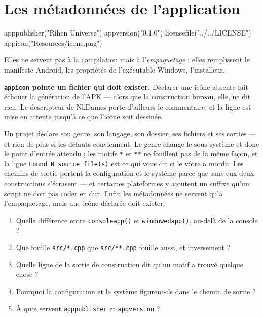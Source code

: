 \section{Les métadonnées de l'application}

\begin{nkcode}{}
apppublisher("Rihen Universe")
appversion("0.1.0")
licensefile("../../LICENSE")
appicon("Resources/icone.png")
\end{nkcode}

\begin{nkretenir}
Elles ne servent pas à la compilation mais à l'\emph{empaquetage} : elles
remplissent le manifeste Android, les propriétés de l'exécutable Windows,
l'installeur.

\textbf{\texttt{appicon} pointe un fichier qui doit exister.} Déclarer une icône
absente fait échouer la génération de l'APK --- alors que la construction bureau,
elle, ne dit rien. Le descripteur de NkDames porte d'ailleurs le commentaire, et
la ligne est mise en attente jusqu'à ce que l'icône soit dessinée.
\end{nkretenir}

\begin{nkbilan}
Un projet déclare son genre, son langage, son dossier, ses fichiers et ses
sorties --- et rien de plus si les défauts conviennent. Le genre change le
sous-système et donc le point d'entrée attendu ; les motifs \texttt{*} et
\texttt{**} ne fouillent pas de la même façon, et la ligne
\texttt{Found N source file(s)} est ce qui vous dit si le vôtre a mordu. Les
chemins de sortie portent la configuration et le système parce que sans eux deux
constructions s'écrasent --- et certaines plateformes y ajoutent un suffixe qu'un
script ne doit pas coder en dur. Enfin les métadonnées ne servent qu'à
l'empaquetage, mais une icône déclarée doit exister.
\end{nkbilan}

\begin{nkquestions}
\begin{enumerate}
\item Quelle différence entre \texttt{consoleapp()} et \texttt{windowedapp()},
      au-delà de la console ?
\item Que fouille \texttt{src/*.cpp} que \texttt{src/**.cpp} fouille aussi, et
      inversement ?
\item Quelle ligne de la sortie de construction dit qu'un motif a trouvé quelque
      chose ?
\item Pourquoi la configuration et le système figurent-ils dans le chemin de
      sortie ?
\item À quoi servent \texttt{apppublisher} et \texttt{appversion} ?
\end{enumerate}
\end{nkquestions}

